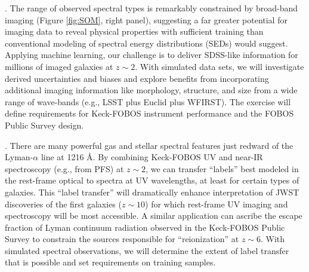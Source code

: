 \documentclass[oneside,11pt]{amsart}
\newcounter{chalno}
\newcommand{\chal}[1]{\refstepcounter{chalno}\label{#1}}
\begin{document}
\medskip
\chal{phot}
.  The range of observed spectral types is remarkably constrained by broad-band imaging (Figure \ref{fig:SOM}, right panel), suggesting a far greater potential for imaging data to reveal physical properties with sufficient training than conventional modeling of spectral energy distributions (SEDs) would suggest.  Applying machine learning, our challenge is to deliver SDSS-like information for millions of imaged galaxies at $z \sim 2$.  With simulated data sets, we will investigate derived uncertainties and biases and explore benefits from incorporating additional imaging information like morphology, structure, and size from a wide range of wave-bands (e.g., LSST plus Euclid plus WFIRST).  The exercise will define requirements for Keck-FOBOS instrument performance and the FOBOS Public Survey design.

\medskip
\chal{uv}
.  There are many powerful gas and stellar spectral features just redward of the Lyman-$\alpha$ line at 1216
\AA.  By combining Keck-FOBOS UV and near-IR spectroscopy (e.g., from PFS) at $z \sim 2$, we can transfer ``labels''
best modeled in the rest-frame optical to spectra at UV wavelengths, at least for certain types of galaxies.  This
``label transfer'' will dramatically enhance interpretation of JWST discoveries of the first galaxies ($z \sim 10$) for
which rest-frame UV imaging and spectroscopy will be most accessible.  A similar application can ascribe the escape
fraction of Lyman continuum radiation observed in the Keck-FOBOS Public Survey to constrain the sources responsible for
``reionization'' at $z \sim 6$.  With simulated spectral observations, we will determine the extent of label transfer
that is possible and set requirements on training samples.
\end{document}
